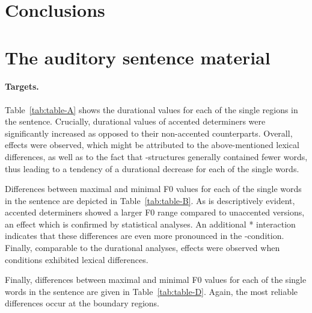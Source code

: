 \documentclass[fleqn,reqno,10pt,draft]{article}
\newcommand{\as}{\acro{as}}
\renewcommand{\es}{\acro{es}}
\begin{document}
\section{Conclusions}
\label{sec:conclusions}

\appendix

\section{The auditory sentence material}
\label{sec:audit-sent-mater}


\paragraph{Targets.} Table~\ref{tab:table-A} shows the durational values for each of
the single regions in the sentence. Crucially, durational values of
accented determiners were significantly increased as opposed to their
non-accented counterparts. Overall,  effects were
observed, which might be attributed to the above-mentioned lexical
differences, as well as to the fact that \es-structures generally
contained fewer words, thus leading to a tendency of a durational
decrease for each of the single words.

Differences between maximal and minimal F0 values for each of the
single words in the sentence are depicted in
Table~\ref{tab:table-B}. As is descriptively evident, accented
determiners showed a larger F0 range compared to unaccented versions,
an effect which is confirmed by statistical analyses. An additional
* interaction indicates that these
differences are even more pronounced in the \as-condition. Finally,
comparable to the durational analyses,  effects were
observed when conditions exhibited lexical differences.

Finally, differences between maximal and minimal F0 values for each of
the single words in the sentence are given in
Table~\ref{tab:table-D}. Again, the most reliable differences occur at
the boundary regions.
\end{document}

